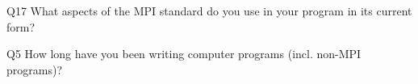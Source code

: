 \begin{description}%
\item{Q17} What aspects of the MPI standard do you use in your program in its current form?%
\item{Q5} How long have you been writing computer programs (incl. non-MPI programs)?%
\end{description}%
